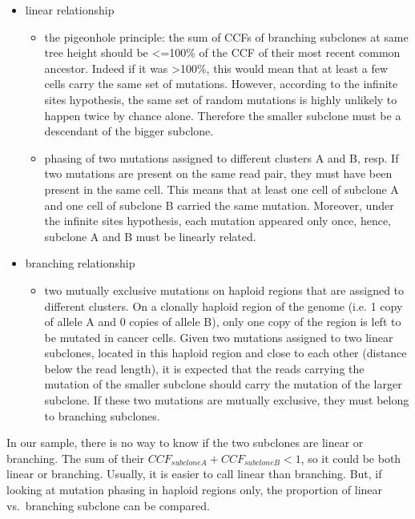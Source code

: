 \documentclass[]{article}
\begin{document}
\begin{itemize}
\item{linear relationship}
  \begin{itemize}
 \item{the pigeonhole principle: the sum of CCFs of branching
     subclones at same tree height should be <=100\% of the CCF of
     their most recent common ancestor. Indeed if it was >100\%, this
     would mean that at least a few cells carry the same set of
     mutations. However, according to the infinite sites hypothesis, the same set of random mutations is highly
     unlikely to happen twice by chance alone. Therefore the
     smaller subclone must be a descendant of the bigger subclone.}
 \item{phasing of two mutations assigned to different clusters A and B, resp. If two
     mutations are present on the same read pair, they must have been
     present in the same cell. This means that at least one cell of subclone A and
     one cell of subclone B carried the same mutation. Moreover, under
     the infinite sites hypothesis, each mutation appeared only once,
     hence, subclone A and B must be linearly related. }
 \end{itemize}
\item{branching relationship}
  \begin{itemize}
  \item{two mutually exclusive mutations on haploid
      regions that are assigned to different clusters. On a clonally haploid
      region of the genome (i.e. 1 copy of allele A and 0 copies of
      allele B), only one copy of the region is left to be
      mutated in cancer cells. Given two mutations assigned to two linear subclones,
      located in this haploid region and close to each other (distance
      below the read length), it is expected that the
      reads carrying the mutation of the smaller subclone should carry
      the mutation of the larger subclone. If these two mutations are
      mutually exclusive, they must belong to branching subclones.}
  \end{itemize}
\end{itemize}

In our sample, there is no way to know if the two subclones are linear
or branching. The sum of their \(CCF_{subcloneA}+CCF_{subcloneB}<1\), so
it could be both linear or branching. Usually, it is easier to call
linear than branching. But, if looking at mutation phasing in haploid
regions only, the proportion of linear vs.~branching subclone can be
compared.
\end{document}

